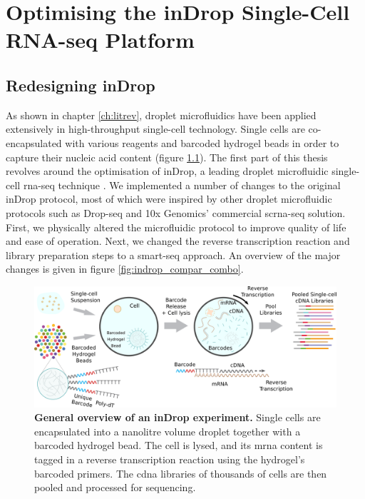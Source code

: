 \newpage
\chapter{Optimising the inDrop Single-Cell RNA-seq Platform}
\label{ch:indrop}

\section{Redesigning inDrop}
\label{sec:redesigning_indrop}
As shown in chapter \ref{ch:litrev}, droplet microfluidics have been applied extensively in high-throughput single-cell technology. Single cells are co-encapsulated with various reagents and barcoded hydrogel beads in order to capture their nucleic acid content (figure \ref{fig:indrop_scrna_overview}). The first part of this thesis revolves around the optimisation of inDrop, a leading droplet microfluidic single-cell \acrshort{rna-seq} technique \citep{klein2015}. We implemented a number of changes to the original inDrop protocol, most of which were inspired by other droplet microfluidic protocols such as Drop-seq and 10x Genomics' commercial \acrshort{scrna-seq} solution. First, we physically altered the microfluidic protocol to improve quality of life and ease of operation. Next, we changed the reverse transcription reaction and library preparation steps to a \acrshort{smart-seq} approach. An overview of the major changes is given in figure \ref{fig:indrop_compar_combo}.\pms

%
\begin{figure}[ht]
\centerfloat
\includegraphics[width=\textwidth]{./ims/indrop_scrna_overview.png}
\caption[General overview of an inDrop experiment]{\textbf{General overview of an inDrop experiment.} Single cells are encapsulated into a nanolitre volume droplet together with a barcoded hydrogel bead. The cell is lysed, and its \acrshort{mrna} content is tagged in a reverse transcription reaction using the hydrogel's barcoded primers. The \acrshort{cdna} libraries of thousands of cells are then pooled and processed for sequencing.}
 \label{fig:indrop_scrna_overview}
\end{figure}

